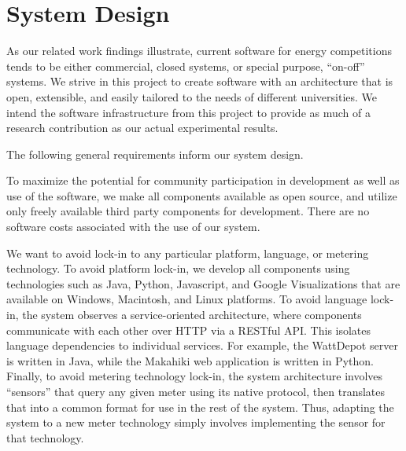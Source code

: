
\section{System Design}
\label{sec:system-design}

As our related work findings illustrate, current software for energy
competitions tends to be either commercial, closed systems, or special
purpose, ``on-off'' systems.  We strive in this project to create
software with an architecture that is open, extensible, and easily tailored
to the needs of different universities.  We intend the software
infrastructure from this project to provide as much of a research
contribution as our actual experimental results.

The following general requirements inform our system design.

  To maximize the potential for community
participation in development as well as use of the software, we make
all components available as open source, and utilize only freely
available third party components for development.  There are no software
costs associated with the use of our system.

We want to avoid lock-in to any particular platform, language, or metering
technology.  To avoid platform lock-in, we develop all components using
technologies such as Java, Python, Javascript, and Google Visualizations
that are available on Windows, Macintosh, and Linux platforms.  To avoid
language lock-in, the system observes a service-oriented architecture,
where components communicate with each other over HTTP via a RESTful API.
This isolates language dependencies to individual services.  For example,
the WattDepot server is written in Java, while the Makahiki web application
is written in Python.  Finally, to avoid metering technology lock-in, the
system architecture involves ``sensors'' that query any given meter using
its native protocol, then translates that into a common format for use in
the rest of the system.  Thus, adapting the system to a new meter
technology simply involves implementing the sensor for that technology.


